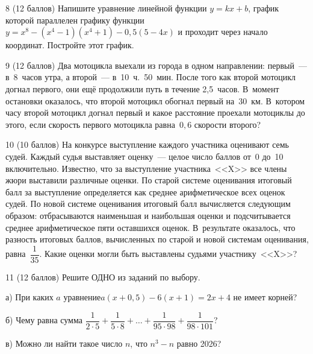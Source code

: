 \smallskip

\begin{problem}{8 (12 баллов)}
Напишите уравнение линейной функции $y = kx + b$, график которой параллелен графику функции $y = x^8 - (x^4 - 1)(x^4 + 1) - 0{,}5(5 - 4x)$ и проходит через начало координат. Постройте этот график.
\end{problem}

\smallskip

\noindent{}

\smallskip

\begin{problem}{9 (12 баллов)}
Два мотоцикла выехали из города в одном направлении: первый~--- в~8~часов утра, а второй~--- в~10~ч.~50~мин. После того как второй мотоцикл догнал первого, они ещё продолжили путь в течение 2,5~часов. В~момент остановки оказалось, что второй мотоцикл обогнал первый на~30~км. В~котором часу второй мотоцикл догнал первый и какое расстояние проехали мотоциклы до этого, если скорость первого мотоцикла равна~$0{,}6$ скорости второго?
\end{problem}

\smallskip

\noindent{}

\smallskip

\begin{problem}{10 (10 баллов)}
    На конкурсе выступление каждого участника оценивают семь судей. Каждый судья выставляет оценку~--- целое число баллов от~0 до~10 включительно. Известно, что за выступление участника~<<X>> все члены жюри выставили различные оценки. По старой системе оценивания итоговый балл за выступление определяется как среднее арифметическое всех оценок судей. По новой системе оценивания итоговый балл вычисляется следующим образом: отбрасываются наименьшая и наибольшая оценки и подсчитывается среднее арифметическое пяти оставшихся оценок. В~результате оказалось, что разность итоговых баллов, вычисленных по старой и новой системам оценивания, равна~$\dfrac{1}{35}$. Какие оценки могли быть выставлены судьями участнику~<<X>>?
\end{problem}

\bigskip

\rowans{1ex}

\bigskip

\begin{problem}{11 (12 баллов)}
Решите ОДНО из заданий по выбору.

\smallskip

\noindent а) При каких $a$ уравнение$a(x+0{,}5)-6(x+1)=2x+4$ не имеет корней?

\smallskip

\noindent б) Чему равна сумма $\dfrac{1}{2\cdot5}+\dfrac{1}{5\cdot8}+\dots+\dfrac{1}{95\cdot98}+\dfrac{1}{98\cdot101}$?

\smallskip

\noindent в) Можно ли найти такое число $n$, что $n^3-n$ равно 2026?
\end{problem}

\smallskip

\noindent{}